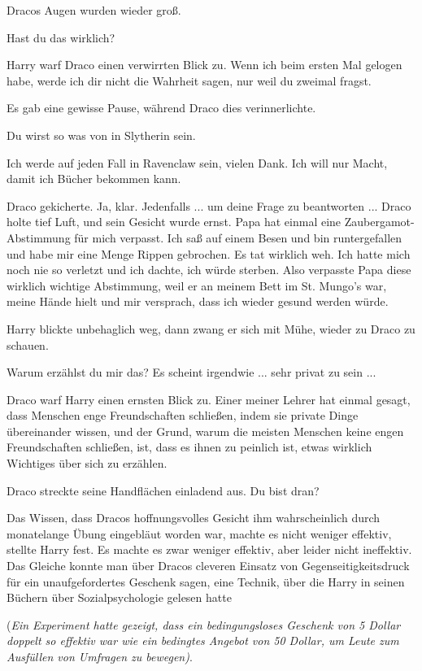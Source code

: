 Dracos Augen wurden wieder groß.

\glqq{}Hast du das wirklich?\grqq{}

Harry warf Draco einen verwirrten Blick zu. \glqq{}Wenn ich beim ersten Mal
gelogen habe, werde ich dir nicht die Wahrheit sagen, nur weil du zweimal
fragst.\grqq{}

Es gab eine gewisse Pause, während Draco dies verinnerlichte.

\glqq{}Du wirst so was von in Slytherin sein.\grqq{}

\glqq{}Ich werde auf jeden Fall in Ravenclaw sein, vielen Dank. Ich will nur
Macht, damit ich Bücher bekommen kann.\grqq{}

Draco gekicherte. \glqq{}Ja, klar. Jedenfalls ... um deine Frage zu beantworten
...\grqq{} Draco holte tief Luft, und sein Gesicht wurde ernst. \glqq{}Papa hat
einmal eine Zaubergamot-Abstimmung für mich verpasst. Ich saß auf einem Besen
und bin runtergefallen und habe mir eine Menge Rippen gebrochen. Es tat wirklich
weh. Ich hatte mich noch nie so verletzt und ich dachte, ich würde sterben. Also
verpasste Papa diese wirklich wichtige Abstimmung, weil er an meinem Bett im
St. Mungo's war, meine Hände hielt und mir versprach, dass ich wieder gesund
werden würde.\grqq{}

Harry blickte unbehaglich weg, dann zwang er sich mit Mühe, wieder zu Draco zu
schauen.

\glqq{}Warum erzählst du mir das? Es scheint irgendwie ... sehr privat zu sein
...\grqq{}

Draco warf Harry einen ernsten Blick zu. \glqq{}Einer meiner Lehrer hat einmal
gesagt, dass Menschen enge Freundschaften schließen, indem sie private Dinge
übereinander wissen, und der Grund, warum die meisten Menschen keine engen
Freundschaften schließen, ist, dass es ihnen zu peinlich ist, etwas wirklich
Wichtiges über sich zu erzählen.\grqq{}

Draco streckte seine Handflächen einladend aus. \glqq{}Du bist dran?\grqq{}

Das Wissen, dass Dracos hoffnungsvolles Gesicht ihm wahrscheinlich durch
monatelange Übung eingebläut worden war, machte es nicht weniger effektiv,
stellte Harry fest. Es machte es zwar weniger effektiv, aber leider nicht
ineffektiv. Das Gleiche konnte man über Dracos cleveren Einsatz von
Gegenseitigkeitsdruck für ein unaufgefordertes Geschenk sagen, eine Technik,
über die Harry in seinen Büchern über Sozialpsychologie gelesen hatte

(\emph{Ein Experiment hatte gezeigt, dass ein bedingungsloses Geschenk von 5
Dollar doppelt so effektiv war wie ein bedingtes Angebot von 50 Dollar, um Leute
zum Ausfüllen von Umfragen zu bewegen)}.

